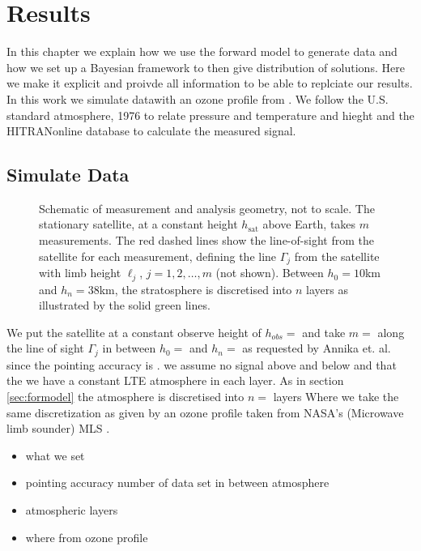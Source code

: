 \chapter{Results}
\label{ch:res}

In this chapter we explain how we use the forward model to generate data and how we set up a Bayesian framework to then give distribution of solutions.
Here we make it explicit and proivde all information to be able to replciate our results.
In this work we simulate datawith an ozone profile from \cite{}.
We follow the U.S. standard atmosphere, 1976 \cite{} to relate pressure and temperature and hieght and the HITRANonline \cite{} database to calculate the measured signal.\expandafter\string\the\font 

\section{Simulate Data}
\begin{figure}[ht!]
	\centering
	
	\label{fig:LIMB}
	\caption{Schematic of measurement and analysis geometry, not to scale.
		The stationary satellite, at a constant height $h_\text{sat}$ above  Earth, takes $m$ measurements.
		The red dashed lines show the line-of-sight from the satellite for each measurement, defining the line $\Gamma_j$ from the satellite with limb height $\ell_j$, $j=1,2,\dots,m$ (not shown).
		Between $h_0 = 10$km and $h_{n} = 38$km, the stratosphere is discretised into $n$ layers as illustrated by the solid green lines.}
\end{figure}
We put the satellite at a constant observe height of $h_{obs} =$ and take $m = $ along the line of sight $\Gamma_j$ in between $h_0= $ and $h_n = $ as requested by Annika et. al. since the pointing accuracy is .
we assume no signal above and below and that the we have a constant LTE atmosphere in each layer.
As in section \ref{sec:formodel} the atmosphere is discretised into $n = $ layers
Where we take the same discretization as given by an ozone profile taken from NASA's (Microwave limb sounder) MLS \cite{}.

\begin{itemize}
	\item what we set
	\item pointing accuracy number of data set in between atmosphere
	\item atmospheric layers
	\item where from ozone profile
\end{itemize}


